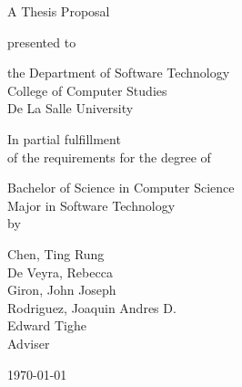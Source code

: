 %
%
%                 

\begin{titlepage}
\centering



\vspace{1.5cm}

A Thesis Proposal\\

\vspace{0.5cm}

presented to\\

\vspace{0.5cm}

the Department of Software Technology\\
College of Computer Studies\\
De La Salle University

\vspace{1cm}

In partial fulfillment\\
of the requirements for the degree of\\

\vspace{0.5cm}

Bachelor of Science in Computer Science\\
Major in Software Technology
\vspace{1.75cm}
\\by\\


\vspace{1cm}

Chen, Ting Rung  \\
De Veyra, Rebecca  \\
Giron, John Joseph  \\
Rodriguez, Joaquin Andres D.  \\

\vspace{1.75cm}
Edward Tighe \\
Adviser

\vspace{1.75cm}
\today
\end{titlepage}
